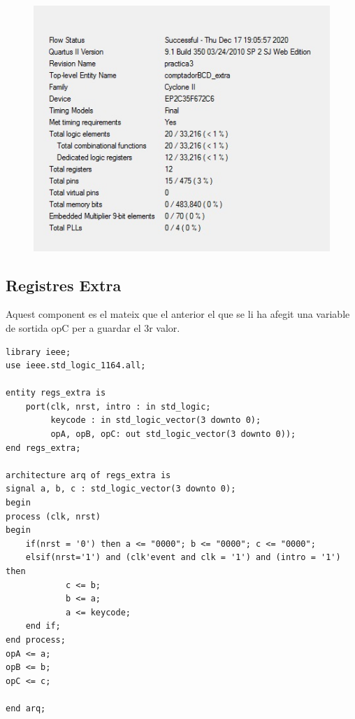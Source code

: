 \documentclass[12pt, a4papre]{article}
\begin{document}
				\begin{figure}[H]
		\begin{center}
		\includegraphics[width=130mm]{informeComptadorBCDextra.jpeg}
		\end{center}
	\end{figure}	
		

\subsection{Registres Extra}
	
	Aquest component es el mateix que el anterior el que se li ha afegit una variable de sortida opC per a guardar el 3r valor.

	\begin{lstlisting}[style=vhdl, frame=single, basicstyle=\tiny]
	library ieee;
use ieee.std_logic_1164.all;

entity regs_extra is
	port(clk, nrst, intro : in std_logic;
		 keycode : in std_logic_vector(3 downto 0);
		 opA, opB, opC: out std_logic_vector(3 downto 0));
end regs_extra;

architecture arq of regs_extra is
signal a, b, c : std_logic_vector(3 downto 0);
begin
process (clk, nrst)
begin 
	if(nrst = '0') then a <= "0000"; b <= "0000"; c <= "0000";
	elsif(nrst='1') and (clk'event and clk = '1') and (intro = '1') then
			c <= b;
			b <= a;
			a <= keycode;
	end if;
end process;
opA <= a;
opB <= b;
opC <= c;

end arq;
	
			\end{lstlisting}
			
\end{document}
